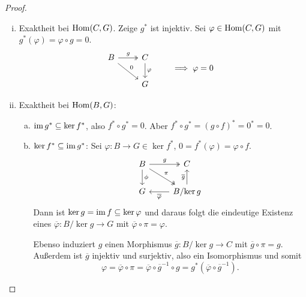 \begin{proof}
  \begin{enumerate}[(i)]
    \item
      Exaktheit bei $\mathrm{Hom}(C,G)$.
      Zeige $g^*$ ist injektiv.
      Sei $\varphi \in \mathrm{Hom}(C,G)$ mit $g^*(\varphi) = \varphi \circ g  = 0$.
      \begin{align*}
        \begin{tikzcd}[ampersand replacement=\&]
          B \arrow{rd}{0} \arrow[twoheadrightarrow]{r}{g}  \& C \arrow{d}{\varphi} \\
                                        \& G
        \end{tikzcd}
        & \qquad \implies \varphi = 0
      \end{align*}
    \item
      Exaktheit bei $\mathrm{Hom}(B,G)$:
      \begin{enumerate}[(a)]
        \item
          $\operatorname{im} g^* \subseteq \ker f^*$, also $f^* \circ g^* = 0$.
          Aber $f^* \circ g^* = {(g \circ f)}^* = 0^* = 0$.
        \item
          $\ker f^* \subseteq \operatorname{im} g^*$:
          Sei $\varphi \colon B \to G \in \ker f^*$, $0 = f^*(\varphi) = \varphi \circ f$.
          \begin{equation*}
            \begin{tikzcd}
              B \arrow[twoheadrightarrow]{r}{g}
                \arrow[twoheadrightarrow]{rd}{\pi}
                \arrow{d}{\phi}
                & C \\
              G & B/{\ker g}  \arrow{u}{\overline g}
                              \arrow{l}{\overline \varphi}
            \end{tikzcd}
          \end{equation*}
          Dann ist $\ker g = \operatorname{im} f \subseteq \ker \varphi$ und daraus folgt die eindeutige Existenz eines $\overline \varphi \colon B/{\ker g} \to G$ mit $\overline \varphi \circ \pi = \varphi$.

          Ebenso induziert $g$ einen Morphismus $\overline g\colon B/{\ker g} \to C$ mit $\overline g \circ \pi = g$.
          Außerdem ist $\overline g$ injektiv und surjektiv, also ein Isomorphismus und somit
          \begin{equation*}
            \varphi = \overline \varphi \circ \pi = \overline \varphi \circ {\overline g}^{-1} \circ g = g^* (\overline \varphi \circ {\overline g}^{-1}).
            \end{equation*}
      \end{enumerate}
  \end{enumerate}
\end{proof}

